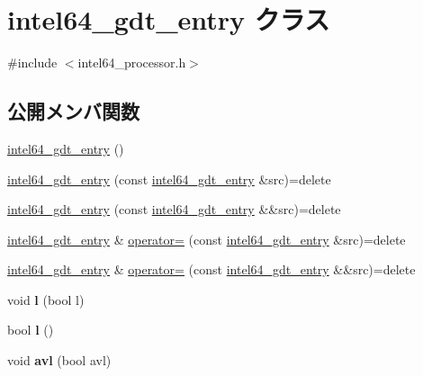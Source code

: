 \hypertarget{classintel64__gdt__entry}{}\section{intel64\+\_\+gdt\+\_\+entry クラス}
\label{classintel64__gdt__entry}


{\ttfamily \#include $<$intel64\+\_\+processor.\+h$>$}

\subsection*{公開メンバ関数}
\begin{DoxyCompactItemize}
\item 
\hyperlink{classintel64__gdt__entry_a7c74c82d45bad2c2f64a3cfa16691ee5}{intel64\+\_\+gdt\+\_\+entry} ()
\item 
\hyperlink{classintel64__gdt__entry_add6680b03a055fb4036f7beac8265234}{intel64\+\_\+gdt\+\_\+entry} (const \hyperlink{classintel64__gdt__entry}{intel64\+\_\+gdt\+\_\+entry} \&src)=delete
\item 
\hyperlink{classintel64__gdt__entry_ab4d847662cabdb86c4ac7110e6acc628}{intel64\+\_\+gdt\+\_\+entry} (const \hyperlink{classintel64__gdt__entry}{intel64\+\_\+gdt\+\_\+entry} \&\&src)=delete
\item 
\hyperlink{classintel64__gdt__entry}{intel64\+\_\+gdt\+\_\+entry} \& \hyperlink{classintel64__gdt__entry_ac94d67eede4e2d4c2584444cd671adb3}{operator=} (const \hyperlink{classintel64__gdt__entry}{intel64\+\_\+gdt\+\_\+entry} \&src)=delete
\item 
\hyperlink{classintel64__gdt__entry}{intel64\+\_\+gdt\+\_\+entry} \& \hyperlink{classintel64__gdt__entry_aa80cb4acf6c8ae6455e7db41963bf206}{operator=} (const \hyperlink{classintel64__gdt__entry}{intel64\+\_\+gdt\+\_\+entry} \&\&src)=delete
\item 
\hypertarget{classintel64__gdt__entry_a5aa7d1cf8508890c007f7f9136d97a12}{}\label{classintel64__gdt__entry_a5aa7d1cf8508890c007f7f9136d97a12} 
void {\bfseries l} (bool l)
\item 
\hypertarget{classintel64__gdt__entry_af850014b898488c6ea660302254987de}{}\label{classintel64__gdt__entry_af850014b898488c6ea660302254987de} 
bool {\bfseries l} ()
\item 
\hypertarget{classintel64__gdt__entry_a60fc3d9578bfb1b69ec3b68b39f440fd}{}\label{classintel64__gdt__entry_a60fc3d9578bfb1b69ec3b68b39f440fd} 
void {\bfseries avl} (bool avl)
\item 

\end{DoxyCompactItemize}
